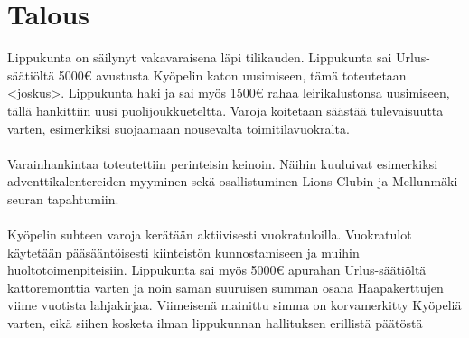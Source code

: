 \section{Talous}
Lippukunta on säilynyt vakavaraisena läpi tilikauden. Lippukunta sai Urlus-säätiöltä 5000\euro{} avustusta Kyöpelin katon uusimiseen, tämä toteutetaan <joskus>. Lippukunta haki ja sai myös 1500\euro{} rahaa leirikalustonsa uusimiseen, tällä hankittiin uusi puolijoukkueteltta. Varoja koitetaan säästää tulevaisuutta varten, esimerkiksi suojaamaan nousevalta toimitilavuokralta.\\
\\Varainhankintaa toteutettiin perinteisin keinoin. Näihin kuuluivat esimerkiksi adventtikalentereiden myyminen sekä osallistuminen Lions Clubin ja Mellunmäki-seuran tapahtumiin.\\
\\Kyöpelin suhteen varoja kerätään aktiivisesti vuokratuloilla. Vuokratulot käytetään pääsääntöisesti kiinteistön kunnostamiseen ja muihin huoltotoimenpiteisiin. Lippukunta sai myös 5000\euro{} apurahan Urlus-säätiöltä kattoremonttia varten ja noin saman suuruisen summan osana Haapakerttujen viime vuotista lahjakirjaa. Viimeisenä mainittu simma on korvamerkitty Kyöpeliä varten, eikä siihen kosketa ilman lippukunnan hallituksen erillistä päätöstä



